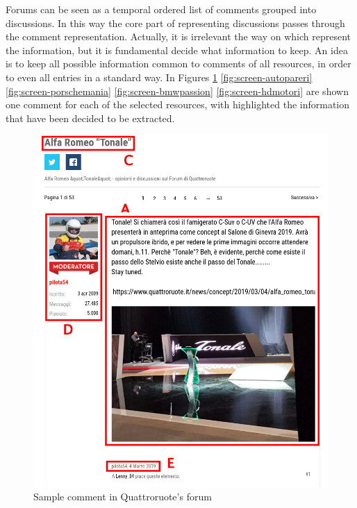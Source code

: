 Forums can be seen as a temporal ordered list of comments grouped into discussions. In this way the core part of representing discussions passes through the comment representation. Actually, it is irrelevant the way on which represent the information, but it is fundamental decide what information to keep. An idea is to keep all possible information common to comments of all resources, in order to even all entries in a standard way. In Figures \ref{fig:screen-quattroruote} \ref{fig:screen-autopareri} \ref{fig:screen-porschemania} \ref{fig:screen-bmwpassion} \ref{fig:screen-hdmotori} are shown one comment for each of the selected resources, with highlighted the information that have been decided to be extracted.

\begin{figure}[!hb]
	\centering
	\includegraphics[width=1\textwidth]{figures/screen/screen-quattroruote.png}
	\caption{Sample comment in Quattroruote's forum}
	\label{fig:screen-quattroruote}
\end{figure}

